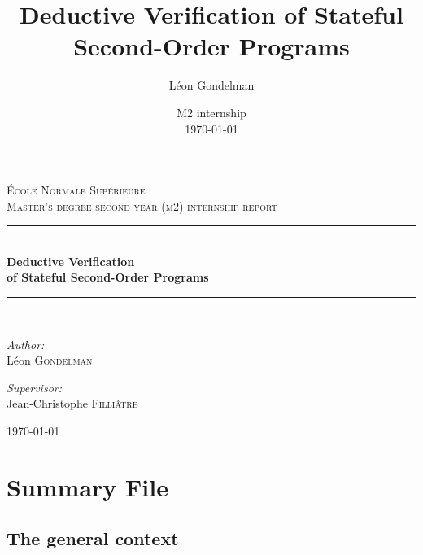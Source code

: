 \documentclass[a4paper,11pt,oneside]{article}
\title{Deductive Verification of Stateful Second-Order Programs}
\author{Léon Gondelman}
\date{M2 internship \\ \today}
\newcommand{\HRule}{\rule{\linewidth}{0.5mm}}
\theoremstyle{plain}
\begin{document}
\begin{center}

\textsc{\LARGE \'Ecole Normale Sup\'erieure}\\[1.5cm]
	
\textsc{Master's degree second year (m{\small 2}) internship report}\\[0.5cm]


\HRule \\[0.4cm]
{ \huge \bfseries Deductive Verification \\[0.5cm] of Stateful Second-Order Programs }\\[0.4cm]

\HRule \\[1.5cm]

\begin{minipage}{0.4\textwidth}
\begin{flushleft} \large
\emph{Author:}\\
L\'eon \textsc{Gondelman}
\end{flushleft}
\end{minipage}
\begin{minipage}{0.4\textwidth}
\begin{flushright} \large
\emph{Supervisor:} \\
Jean-Christophe \textsc{Filli\^atre}
\end{flushright}
\end{minipage}

\vfill

{\large \today}

\end{center}

\maketitle



\section*{Summary File}

\subsection*{The general context}
\end{document}
